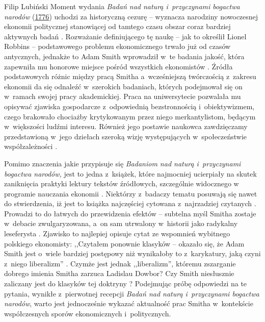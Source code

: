 \begin{artplenv}{Filip Lubiński}
Moment wydania \textit{Badań nad naturą i~przyczynami bogactwa narodów} (\hyperlink{smith-bib}{1776}) uchodzi za historyczną
cezurę -- wyznacza narodziny nowoczesnej ekonomii politycznej stanowiącej od tamtego czasu obszar coraz bardziej aktywnych badań
\parencite[s.~199]{broadie_history_2009}.
Rozważanie definiującego tę naukę -- jak to określił Lionel
Robbins -- podstawowego problemu ekonomicznego
\parencite[s.~15]{robbins_essay_1932}
trwało już od czasów antycznych,
jednakże to Adam Smith wprowadził w~te badania jakość, która zapewniła mu honorowe miejsce pośród wszystkich
ekonomistów
\parencite[s.~XII]{gordon_economic_1975}.
Źródła podstawowych różnic między pracą
Smitha a~wcześniejszą twórczością z~zakresu ekonomii da się odnaleźć w~szerokich badaniach, których podejmował się on w~ramach
swojej pracy akademickiej. Praca na uniwersytecie pozwalała mu opisywać zjawiska gospodarcze z~odpowiednią
bezstronnością i~obiektywizmem, czego brakowało chociażby krytykowanym przez niego merkantylistom,
będącym w~większości ludźmi interesu. Również jego postawie naukowca zawdzięczamy
przedstawioną w~jego dziełach szeroką wizję występujących w~społeczeństwie współzależności
\parencite[s.~111–112]{landreth_historia_1998}.

Pomimo znaczenia jakie przypisuje się \textit{Badaniom nad naturą i~przyczynami bogactwa narodów,} jest to
jedna z~książek, które najmocniej ucierpiały na skutek zaniknięcia praktyki lektury tekstów źródłowych, szczególnie widocznego
w programie nauczania ekonomii
\parencite[s.~58]{blaug_teoria_1994}.
Niektórzy z~badaczy tematu posuwają się
nawet do stwierdzenia, iż jest to książka najczęściej cytowana z~najrzadziej czytanych
\parencite[s.~67]{heilbroner_worldly_1999}.
Prowadzi to do łatwych do przewidzenia efektów -- subtelna myśl
Smitha zostaje w~debacie zwulgaryzowana, a~on sam utrwalony w~historii jako radykalny leseferysta
\parencites[s.~16–17]{skousen_big_2007}[s.~152]{landreth_historia_1998}[s.~261]{rasmussen_pragmatic_2014}.
Zjawisko
to najlepiej opisuje cytat ze wspomnień wybitnego polskiego ekonomisty: ,,Czytałem ponownie klasyków -- okazało się, że
Adam Smith jest o~wiele bardziej postępowy niż wynikałoby to z~karykatury, jaką czyni z~niego
liberalizm''
\parencite[s.~39]{dowbor_rozbita_2005}.
Czymże jest jednak
,,liberalizm'', któremu zszarganie dobrego imienia Smitha zarzuca Ladislau Dowbor? Czy Smith niesłusznie zaliczany jest
do klasyków tej doktryny
\parencite[s.~38]{gray_liberalizm_1994}?
Podejmując próbę odpowiedzi na te pytania,
wynikłe z~pierwotnej recepcji \textit{Badań nad naturą i~przyczynami bogactwa narodów}, warto jest jednocześnie wykazać
aktualność prac Smitha w~kontekście współczesnych sporów ekonomicznych i~politycznych.


\end{artplenv}
